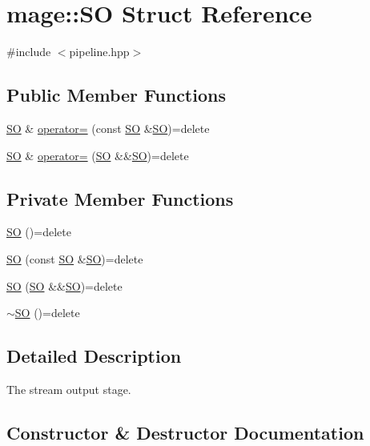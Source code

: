 \hypertarget{structmage_1_1_s_o}{}\section{mage\+:\+:SO Struct Reference}
\label{structmage_1_1_s_o}


{\ttfamily \#include $<$pipeline.\+hpp$>$}

\subsection*{Public Member Functions}
\begin{DoxyCompactItemize}
\item 
\hyperlink{structmage_1_1_s_o}{SO} \& \hyperlink{structmage_1_1_s_o_a40dcf211be0d585e2d73961428b5eaa4}{operator=} (const \hyperlink{structmage_1_1_s_o}{SO} \&\hyperlink{structmage_1_1_s_o}{SO})=delete
\item 
\hyperlink{structmage_1_1_s_o}{SO} \& \hyperlink{structmage_1_1_s_o_a6f2555766d1966706be99e4d4f61d1a7}{operator=} (\hyperlink{structmage_1_1_s_o}{SO} \&\&\hyperlink{structmage_1_1_s_o}{SO})=delete
\end{DoxyCompactItemize}
\subsection*{Private Member Functions}
\begin{DoxyCompactItemize}
\item 
\hyperlink{structmage_1_1_s_o_a51b79487ce2a182370d738d1fc123241}{SO} ()=delete
\item 
\hyperlink{structmage_1_1_s_o_a4b86bf4670df273a529f42e9b76e6c18}{SO} (const \hyperlink{structmage_1_1_s_o}{SO} \&\hyperlink{structmage_1_1_s_o}{SO})=delete
\item 
\hyperlink{structmage_1_1_s_o_a681a1666b14e8667cf77960d7675c876}{SO} (\hyperlink{structmage_1_1_s_o}{SO} \&\&\hyperlink{structmage_1_1_s_o}{SO})=delete
\item 
\hyperlink{structmage_1_1_s_o_aa3a21c9b772cfdc4544bcb46ff6531e2}{$\sim$\+SO} ()=delete
\end{DoxyCompactItemize}


\subsection{Detailed Description}
The stream output stage. 

\subsection{Constructor \& Destructor Documentation}
\hypertarget{structmage_1_1_s_o_a51b79487ce2a182370d738d1fc123241}{}\label{structmage_1_1_s_o_a51b79487ce2a182370d738d1fc123241} 
